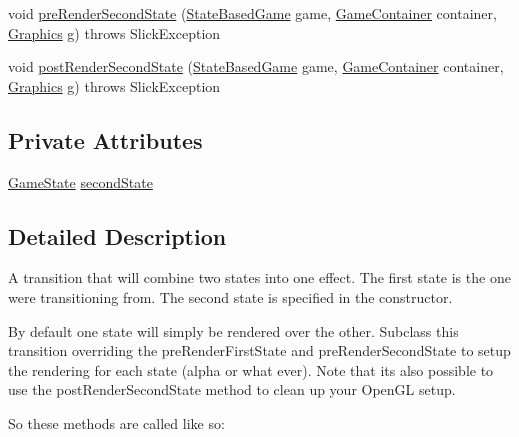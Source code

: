 \begin{DoxyCompactItemize}
\item 
void \mbox{\hyperlink{classorg_1_1newdawn_1_1slick_1_1state_1_1transition_1_1_cross_state_transition_a87a8c85266ef00b34bbe8888c358aab0}{pre\+Render\+Second\+State}} (\mbox{\hyperlink{classorg_1_1newdawn_1_1slick_1_1state_1_1_state_based_game}{State\+Based\+Game}} game, \mbox{\hyperlink{classorg_1_1newdawn_1_1slick_1_1_game_container}{Game\+Container}} container, \mbox{\hyperlink{classorg_1_1newdawn_1_1slick_1_1_graphics}{Graphics}} g)  throws Slick\+Exception 
\item 
void \mbox{\hyperlink{classorg_1_1newdawn_1_1slick_1_1state_1_1transition_1_1_cross_state_transition_a8b0b46e75abd29cf46e844de048b6227}{post\+Render\+Second\+State}} (\mbox{\hyperlink{classorg_1_1newdawn_1_1slick_1_1state_1_1_state_based_game}{State\+Based\+Game}} game, \mbox{\hyperlink{classorg_1_1newdawn_1_1slick_1_1_game_container}{Game\+Container}} container, \mbox{\hyperlink{classorg_1_1newdawn_1_1slick_1_1_graphics}{Graphics}} g)  throws Slick\+Exception 
\end{DoxyCompactItemize}
\subsection*{Private Attributes}
\begin{DoxyCompactItemize}
\item 
\mbox{\hyperlink{interfaceorg_1_1newdawn_1_1slick_1_1state_1_1_game_state}{Game\+State}} \mbox{\hyperlink{classorg_1_1newdawn_1_1slick_1_1state_1_1transition_1_1_cross_state_transition_a75dc8f5366c67cb40b833672578fd7e5}{second\+State}}
\end{DoxyCompactItemize}


\subsection{Detailed Description}
A transition that will combine two states into one effect. The first state is the one we\textquotesingle{}re transitioning from. The second state is specified in the constructor.

By default one state will simply be rendered over the other. Subclass this transition overriding the pre\+Render\+First\+State and pre\+Render\+Second\+State to setup the rendering for each state (alpha or what ever). Note that it\textquotesingle{}s also possible to use the post\+Render\+Second\+State method to clean up your Open\+GL setup.

So these methods are called like so\+:

